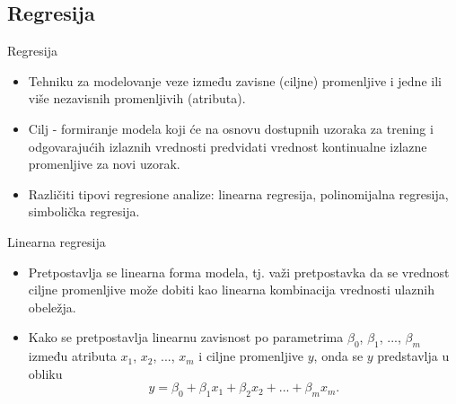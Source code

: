 \documentclass{beamer}
\begin{document}
\subsection{Regresija}
\begin{frame}{Regresija}
\begin{itemize}
    \item Tehniku za modelovanje veze izmed̄u zavisne (ciljne) promenljive i jedne ili više nezavisnih promenljivih (atributa).
    \item Cilj - formiranje modela koji će na osnovu dostupnih uzoraka za trening i odgovarajućih izlaznih vrednosti predvidati vrednost kontinualne izlazne promenljive za novi uzorak.
    \item Različiti tipovi regresione analize: linearna regresija, polinomijalna regresija, simbolička regresija.
\end{itemize}

\end{frame}

\begin{frame}{Linearna regresija}
\begin{itemize}
    \item Pretpostavlja se linearna forma modela, tj. važi pretpostavka da se vrednost ciljne promenljive može dobiti kao linearna kombinacija vrednosti ulaznih obeležja.
    \item Kako se pretpostavlja linearnu zavisnost po parametrima $\beta_0$, $\beta_1$, ..., $\beta_m$ između atributa $x_1$, $x_2$, ..., $x_m$ i ciljne promenljive $y$, onda se $y$ predstavlja u obliku
    \[ y = \beta_0 + \beta_1 x_1 + \beta_2 x_2 + ... + \beta_m x_m .\]
\end{itemize}
\end{frame}
\end{document}
